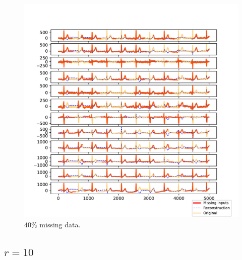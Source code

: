 \documentclass{mldsmsc}
\begin{document}
\begin{figure}[H]
\vspace{1em} %

\begin{minipage}{0.4\linewidth}
    \centering
    \includegraphics[width=\linewidth]{images/missing/tmf_output_40_3.pdf}
    \caption{$40\%$ missing data.}
\end{minipage}
\end{figure}

\subsection{$r = 10$}
\end{document}
